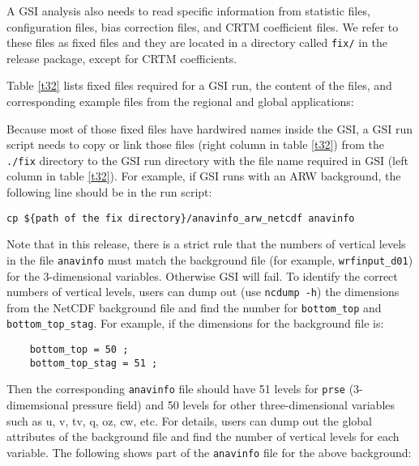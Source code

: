 A GSI analysis also needs to read specific information from statistic files, configuration files, bias correction files, and CRTM coefficient files. We refer to these files as fixed files and they are located in a directory called  \verb|fix/| in the release package, except for CRTM coefficients. 

Table \ref{t32}  lists fixed files required for a GSI run, the content of the files, and corresponding example files from the regional and global applications:

Because most of those fixed files have hardwired names inside the GSI, a GSI run script needs to copy or link those files (right column in table \ref{t32})  from the \verb|./fix| directory to the GSI run directory with the file name required in GSI (left column in table \ref{t32}). For example, if GSI runs with an ARW background, the following line should be in the run script:

\begin{small}
\begin{verbatim}
cp ${path of the fix directory}/anavinfo_arw_netcdf anavinfo
\end{verbatim}
\end{small}

Note that in this release, there is a strict rule that the numbers of vertical levels in the file \verb|anavinfo| must match the background file (for example, \verb|wrfinput_d01|) for the 3-dimensional variables. Otherwise GSI will fail. To identify the correct numbers of vertical levels, users can dump out (use \verb|ncdump -h|) the dimensions from the NetCDF background file and find the number for \verb|bottom_top| and \verb|bottom_top_stag|. For example, if the dimensions for the background file is:

\begin{small}
\begin{verbatim}
    bottom_top = 50 ;
    bottom_top_stag = 51 ;
\end{verbatim}
\end{small}

Then the corresponding \verb|anavinfo| file should have 51 levels for \verb|prse| (3-dimemsional pressure field) and 50 levels for other three-dimensional variables such as u, v, tv, q, oz, cw, etc. For details, users can dump out the global attributes of the background file and find the number of vertical levels for each variable. The following shows part of the \verb|anavinfo| file for the above background:

\newpage

